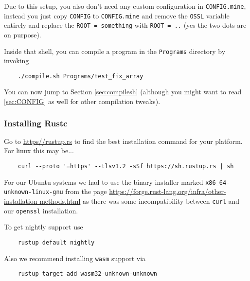 Due to this setup, you also don't need any custom configuration in \verb+CONFIG.mine+, instead
you just copy \verb+CONFIG+ to \verb+CONFIG.mine+ and remove the \verb+OSSL+ variable entirely and 
replace the \verb+ROOT = something+ with \verb+ROOT = ..+ (yes the two dots are on purpose).

Inside that shell, you can compile a program in the \verb+Programs+ directory by invoking
\begin{verbatim}
    ./compile.sh Programs/test_fix_array
\end{verbatim}
You can now jump to Section \ref{sec:compilesh} (although you might want to read \ref{sec:CONFIG}
as well for other compilation tweaks).

\subsubsection{Installing Rustc}

Go to \url{https//rustup.rs} to find the best installation command for your platform.
For linux this may be...
\begin{verbatim}
    curl --proto '=https' --tlsv1.2 -sSf https://sh.rustup.rs | sh
\end{verbatim}
For our Ubuntu systems we had to use the binary installer marked
\verb+x86_64-unknown-linux-gnu+ from the page
\url{https://forge.rust-lang.org/infra/other-installation-methods.html}
as there was some incompatibility between \verb+curl+ and our
\verb+openssl+ installation.

To get nightly support use
\begin{verbatim}
    rustup default nightly
\end{verbatim}
Also we recommend installing \verb|wasm| support via
\begin{verbatim}
    rustup target add wasm32-unknown-unknown
\end{verbatim}


